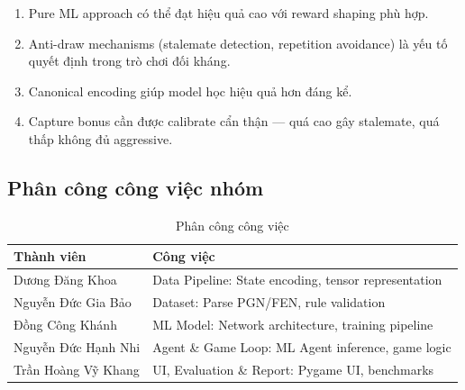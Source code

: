 \begin{enumerate}
    \item Pure ML approach có thể đạt hiệu quả cao với reward shaping phù hợp.
    \item Anti-draw mechanisms (stalemate detection, repetition avoidance) là yếu tố quyết định trong trò chơi đối kháng.
    \item Canonical encoding giúp model học hiệu quả hơn đáng kể.
    \item Capture bonus cần được calibrate cẩn thận --- quá cao gây stalemate, quá thấp không đủ aggressive.
\end{enumerate}

\subsection{Phân công công việc nhóm}
\begin{table}[H]
\centering
\caption{Phân công công việc}
\begin{tabularx}{\textwidth}{lX}
\toprule
\textbf{Thành viên} & \textbf{Công việc} \\
\midrule
Dương Đăng Khoa & Data Pipeline: State encoding, tensor representation \\
Nguyễn Đức Gia Bảo & Dataset: Parse PGN/FEN, rule validation \\
Đồng Công Khánh & ML Model: Network architecture, training pipeline \\
Nguyễn Đức Hạnh Nhi & Agent \& Game Loop: ML Agent inference, game logic \\
Trần Hoàng Vỹ Khang & UI, Evaluation \& Report: Pygame UI, benchmarks \\
\bottomrule
\end{tabularx}
\end{table}
